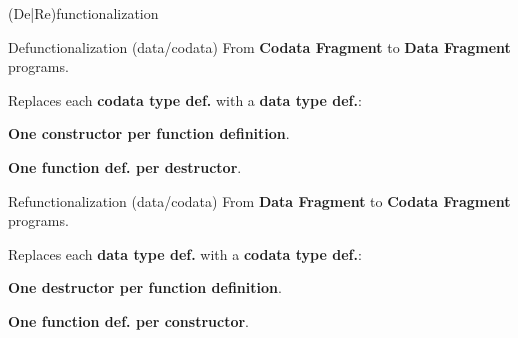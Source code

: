 \documentclass[xcolor=svgnames]{beamer}
\begin{document}
\begin{frame}
  {(De|Re)functionalization}

  \begin{block}{Defunctionalization (data/codata)}
    From \textbf{Codata Fragment} to \textbf{Data Fragment} programs.

    Replaces each \textbf{codata type def.} with a \textbf{data type def.}:

    \textbf{One constructor per function definition}.

    \textbf{One function def. per destructor}.
  \end{block}

  \begin{block}{Refunctionalization (data/codata)}
    From \textbf{Data Fragment} to \textbf{Codata Fragment} programs.

    Replaces each \textbf{data type def.} with a \textbf{codata type def.}:

    \textbf{One destructor per function definition}.

    \textbf{One function def. per constructor}.
  \end{block}
\end{frame}
\end{document}
